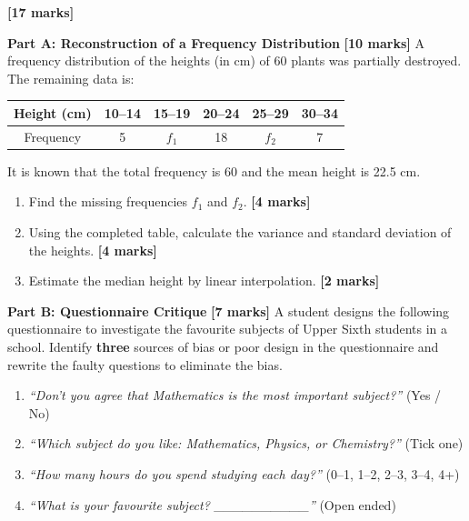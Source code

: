 \documentclass[11pt]{article}
\begin{document}
\begin{exercice} \textbf{[17 marks]}

\textbf{Part A: Reconstruction of a Frequency Distribution} \textbf{[10 marks]}
A frequency distribution of the heights (in cm) of 60 plants was partially destroyed. The remaining data is:

\begin{center}
\begin{tabular}{|c|c|c|c|c|c|}\hline
Height (cm) & 10--14 & 15--19 & 20--24 & 25--29 & 30--34 \\ \hline
Frequency & 5 & $f_1$ & 18 & $f_2$ & 7 \\ \hline
\end{tabular}
\end{center}

It is known that the total frequency is 60 and the mean height is 22.5 cm.

\begin{enumerate}
\item Find the missing frequencies $f_1$ and $f_2$. \textbf{[4 marks]}
\item Using the completed table, calculate the variance and standard deviation of the heights. \textbf{[4 marks]}
\item Estimate the median height by linear interpolation. \textbf{[2 marks]}
\end{enumerate}

\textbf{Part B: Questionnaire Critique} \textbf{[7 marks]}
A student designs the following questionnaire to investigate the favourite subjects of Upper Sixth students in a school. Identify \textbf{three} sources of bias or poor design in the questionnaire and rewrite the faulty questions to eliminate the bias.

\begin{enumerate}
\item \emph{``Don't you agree that Mathematics is the most important subject?''} \hfill (Yes / No)
\item \emph{``Which subject do you like: Mathematics, Physics, or Chemistry?''} \hfill (Tick one)
\item \emph{``How many hours do you spend studying each day?''} \hfill (0--1, 1--2, 2--3, 3--4, 4+)
\item \emph{``What is your favourite subject? \_\_\_\_\_\_\_\_\_\_''} \hfill (Open ended)
\end{enumerate}
\end{exercice}
\end{document}
